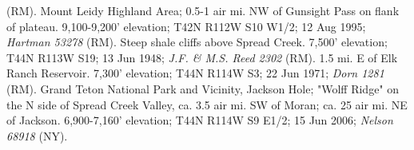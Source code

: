 (RM).  Mount Leidy Highland Area; 0.5-1 air mi. NW of Gunsight Pass on flank of plateau. 9,100-9,200' elevation; T42N R112W S10 W1/2; 12 Aug 1995; \textit{Hartman 53278} (RM).  Steep shale cliffs above Spread Creek. 7,500' elevation; T44N R113W S19; 13 Jun 1948; \textit{J.F. \& M.S. Reed 2302} (RM).  1.5 mi. E of Elk Ranch Reservoir. 7,300' elevation; T44N R114W S3; 22 Jun 1971; \textit{Dorn 1281} (RM).  Grand Teton National Park and Vicinity, Jackson Hole; "Wolff Ridge" on the N side of Spread Creek Valley, ca. 3.5 air mi. SW of Moran; ca. 25 air mi. NE of Jackson. 6,900-7,160' elevation; T44N R114W S9 E1/2; 15 Jun 2006; \textit{Nelson 68918} (NY).  